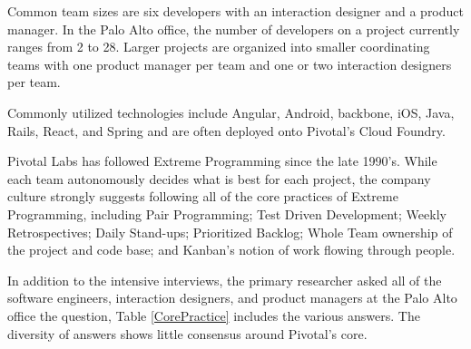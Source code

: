 Common team sizes are six developers with an interaction designer and a product manager. In the Palo Alto office, the number of developers on a project currently ranges from 2 to 28. Larger projects are organized into smaller coordinating teams with one product manager per team and one or two interaction designers per team. 

Commonly utilized technologies include Angular, Android, backbone, iOS, Java, Rails, React, and Spring and are often deployed onto Pivotal's Cloud Foundry. 

Pivotal Labs has followed Extreme Programming \cite{ExtremeProgramming2004} since the late 1990's. While each team autonomously decides what is best for each project, the company culture strongly suggests following all of the core practices of Extreme Programming, including Pair Programming; Test Driven Development; Weekly Retrospectives; Daily Stand-ups; Prioritized Backlog; Whole Team ownership of the project and code base; and Kanban's notion of work flowing through people.

In addition to the intensive interviews, the primary researcher asked all of the software engineers, interaction designers, and product managers at the Palo Alto office the question,  Table \ref{CorePractice} includes the various answers. The diversity of answers shows little consensus around Pivotal's core. 

